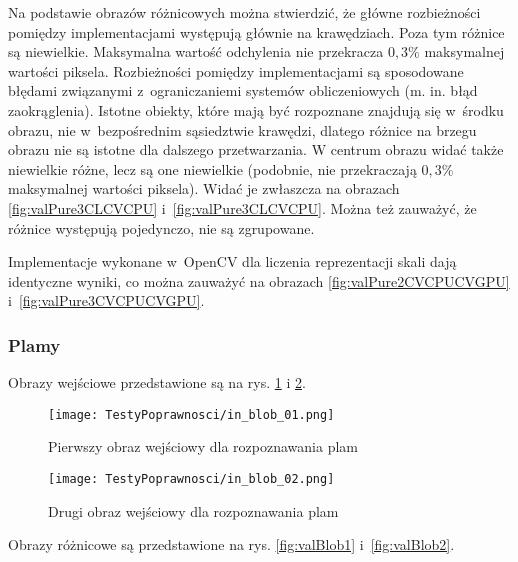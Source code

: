 Na podstawie obrazów różnicowych można stwierdzić, że główne rozbieżności pomiędzy implementacjami występują głównie na krawędziach. Poza tym różnice są niewielkie. Maksymalna wartość odchylenia nie przekracza $ 0,3\% $ maksymalnej wartości piksela. Rozbieżności pomiędzy implementacjami są sposodowane błędami związanymi z~ograniczaniemi systemów obliczeniowych (m. in. błąd zaokrąglenia). Istotne obiekty, które mają być rozpoznane znajdują się w~środku obrazu, nie w~bezpośrednim sąsiedztwie krawędzi, dlatego różnice na brzegu obrazu nie są istotne dla dalszego przetwarzania. W centrum obrazu widać także niewielkie różne, lecz są one niewielkie (podobnie, nie przekraczają $ 0,3\% $ maksymalnej wartości piksela). Widać je zwłaszcza na obrazach \ref{fig:valPure3CLCVCPU} i~\ref{fig:valPure3CLCVCPU}. Można też zauważyć, że różnice występują pojedynczo, nie są zgrupowane.

Implementacje wykonane w~OpenCV dla liczenia reprezentacji skali dają identyczne wyniki, co można zauważyć na obrazach \ref{fig:valPure2CVCPUCVGPU} i~\ref{fig:valPure3CVCPUCVGPU}.

\subsubsection{Plamy}
\label{subsubsec:plamyRysunki}

Obrazy wejściowe przedstawione są na rys. \ref{fig:valBlob01} i \ref{fig:valBlob02}.

\begin{figure}[h]
\begin{center}
\texttt{[image: TestyPoprawnosci/in\_blob\_01.png]}
\end{center}
\caption{Pierwszy obraz wejściowy dla rozpoznawania plam}
\label{fig:valBlob01}
\end{figure}

\begin{figure}[h]
\begin{center}
\texttt{[image: TestyPoprawnosci/in\_blob\_02.png]}
\end{center}
\caption{Drugi obraz wejściowy dla rozpoznawania plam}
\label{fig:valBlob02}
\end{figure}

Obrazy różnicowe są przedstawione na rys. \ref{fig:valBlob1} i~\ref{fig:valBlob2}. 

